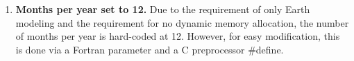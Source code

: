 
\begin{enumerate}

\item {\bf Months per year set to 12.} Due to the requirement of only Earth 
modeling and the requirement for no
dynamic memory allocation, the number of months per year is hard-coded
at 12.  However, for easy modification, this is done via a Fortran parameter 
and a C preprocessor \#define.

\end{enumerate}
